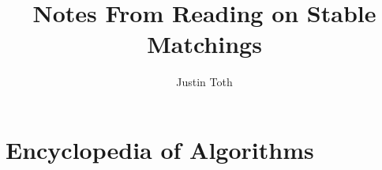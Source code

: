 \documentclass{article}
\begin{document}



\title{Notes From Reading on Stable Matchings}
\author{Justin Toth} 
\maketitle
\section{Encyclopedia of Algorithms}
\end{document}
